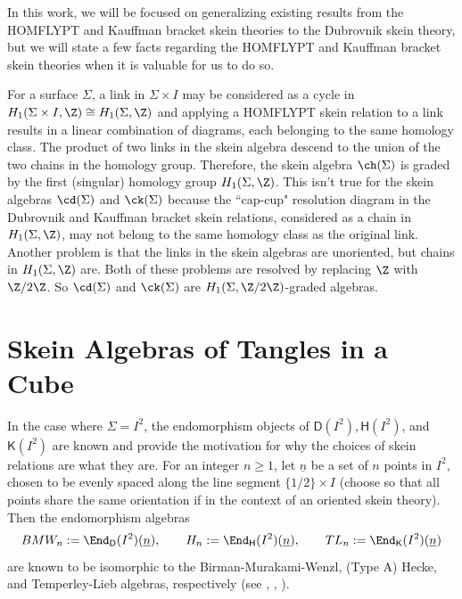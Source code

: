 In this work, we will be focused on generalizing existing results from the HOMFLYPT and Kauffman bracket skein theories to the Dubrovnik skein theory, but we will state a few facts regarding the HOMFLYPT and Kauffman bracket skein theories when it is valuable for us to do so. 

\begin{remark}
For a surface $\Sigma$, a link in $\Sigma \times I$ may be considered as a cycle in $H_1(\Sigma \times I, \Z) \cong H_1(\Sigma, \Z)$ and applying a HOMFLYPT skein relation to a link results in a linear combination of diagrams, each belonging to the same homology class. The product of two links in the skein algebra descend to the union of the two chains in the homology group. Therefore, the skein algebra $\ch(\Sigma)$ is graded by the first (singular) homology group $H_1(\Sigma, \Z)$. This isn't true for the skein algebras $\cd(\Sigma)$ and $\ck(\Sigma)$ because the ``cap-cup" resolution diagram in the Dubrovnik and Kauffman bracket skein relations, considered as a chain in $H_1(\Sigma, \Z)$, may not belong to the same homology class as the original link. Another problem is that the links in the skein algebras are unoriented, but chains in $H_1(\Sigma, \Z)$ are. Both of these problems are resolved by replacing $\Z$ with $\Z/2\Z$. So $\cd(\Sigma)$ and $\ck(\Sigma)$ are $H_1(\Sigma, \Z/2\Z)$-graded algebras. 
\end{remark}

\section{Skein Algebras of Tangles in a Cube} \label{sec:cube}

In the case where $\Sigma = I^2$, the endomorphism objects of $\mathsf{D}(I^2), \mathsf{H}(I^2)$, and $\mathsf{K}(I^2)$ are known and provide the motivation for why the choices of skein relations are what they are. For an integer $n \geq 1$, let $\underline{n}$ be a set of $n$ points in $I^2$, chosen to be evenly spaced along the line segment $\{ 1/2 \} \times I$ (choose so that all points share the same orientation if in the context of an oriented skein theory). Then the endomorphism algebras 
\[
BMW_n := \End_\mathsf{D}(I^2)(\underline{n}), \qquad H_n := \End_\mathsf{H}(I^2)(\underline{n}), \qquad TL_n := \End_\mathsf{K}(I^2)(\underline{n})
\]
are known to be isomorphic to the Birman-Murakami-Wenzl, (Type A) Hecke, and Temperley-Lieb algebras, respectively (see \cite{Abr08}, \cite{AM98}, \cite{Mor10}).

